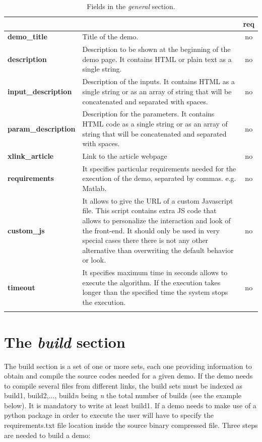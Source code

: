 % 
\begin{longtable}{|>{\bf}L{\linewidth}|L{\linewidth}|c|}
\hline
      &  & {\bf req} 
\tabularnewline \hline \hline
 demo\_title         & Title of the demo. & no\\ \hline
 description         & Description to be shown at the beginning of the demo page. It contains HTML or plain text as a single string. & no \\ \hline
 input\_description  & Description of the inputs. It contains HTML as a single string or as an array of string that will be concatenated and separated with spaces. & no \\ \hline
 param\_description  & Description for the parameters. It contains HTML code as a single string or as an array of string that will be concatenated and separated with spaces. & no
\\ \hline
 xlink\_article     & Link to the article webpage & no  \\ \hline
 requirements 	    & It specifies particular requirements needed for the execution of the demo, separated by commas. e.g. Matlab. & no \\ \hline
 custom\_js 	    & It allows to give the URL of a custom Javascript file. This script contains extra JS code that allows to personalize the interaction and look of the front-end. It should only be used in very special cases there there is not any other alternative than overwriting the default behavior or look. & no \\ \hline
 timeout 	    & It specifies maximum time in seconds allows to execute the algorithm. If the execution takes longer than the specified time the system stops the execution. & no \\ \hline
\caption{Fields in the \emph{general} section.}
\end{longtable}

\section{The \emph{build} section}

The build section is a set of one or more sets, each one providing information to obtain and compile the source codes needed for a given demo. If the demo needs to compile several files from different links, the build sets must be indexed as build1, build2,..., build\textit{n} being \textit{n} the total number of builds (see the example below). It is mandatory to write at least build1. If a demo needs to make use of a python package in order to execute the user will have to specify the requirements.txt file location inside the source binary compressed file. Three steps are needed to build a demo: 

